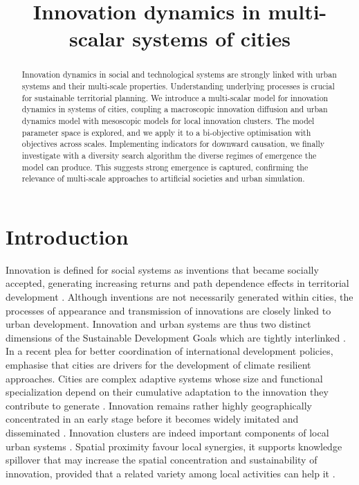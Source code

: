 \documentclass[letterpaper]{article}
\title{Innovation dynamics in multi-scalar systems of cities}
\author{}
\begin{document}
\maketitle

\begin{abstract}
Innovation dynamics in social and technological systems are strongly linked with urban systems and their multi-scale properties. Understanding underlying processes is crucial for sustainable territorial planning. We introduce a multi-scalar model for innovation dynamics in systems of cities, coupling a macroscopic innovation diffusion and urban dynamics model with mesoscopic models for local innovation clusters. The model parameter space is explored, and we apply it to a bi-objective optimisation with objectives across scales. Implementing indicators for downward causation, we finally investigate with a diversity search algorithm the diverse regimes of emergence the model can produce. This suggests strong emergence is captured, confirming the relevance of multi-scale approaches to artificial societies and urban simulation.
\end{abstract}



\section{Introduction}


Innovation is defined for social systems as inventions that became socially accepted, generating increasing returns and path dependence effects in territorial development \citep{arthur1994increasing}. Although inventions are not necessarily generated within cities, the processes of appearance and transmission of innovations are closely linked to urban development. Innovation and urban systems are thus two distinct dimensions of the Sustainable Development Goals which are tightly interlinked \citep{hegre2020synergies}. In a recent plea for better coordination of international development policies, \cite{keith2022new} emphasise that cities are drivers for the development of climate resilient approaches. Cities are complex adaptive systems whose size and functional specialization depend on their cumulative adaptation to the innovation they contribute to generate \citep{pumain2020theories}. Innovation remains rather highly geographically concentrated in an early stage before it becomes widely imitated and disseminated \citep{audretsch1996innovative}. Innovation clusters are indeed important components of local urban systems \citep{moreno2006innovation}. Spatial proximity favour local synergies, it supports knowledge spillover that may increase the spatial concentration and sustainability of innovation, provided that a related variety among local activities can help it \citep{boschma2009related,frenken2007related}.
\end{document}
